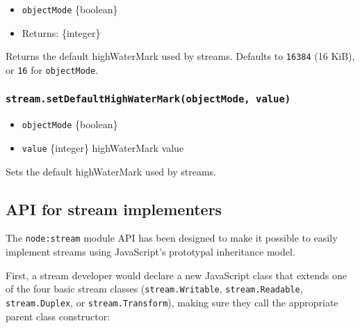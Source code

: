 \begin{itemize}
\tightlist
\item
  \texttt{objectMode} \{boolean\}
\item
  Returns: \{integer\}
\end{itemize}

Returns the default highWaterMark used by streams. Defaults to
\texttt{16384} (16 KiB), or \texttt{16} for \texttt{objectMode}.

\subsubsection{\texorpdfstring{\texttt{stream.setDefaultHighWaterMark(objectMode,\ value)}}{stream.setDefaultHighWaterMark(objectMode, value)}}\label{stream.setdefaulthighwatermarkobjectmode-value}

\begin{itemize}
\tightlist
\item
  \texttt{objectMode} \{boolean\}
\item
  \texttt{value} \{integer\} highWaterMark value
\end{itemize}

Sets the default highWaterMark used by streams.

\subsection{API for stream
implementers}\label{api-for-stream-implementers}

The \texttt{node:stream} module API has been designed to make it
possible to easily implement streams using JavaScript's prototypal
inheritance model.

First, a stream developer would declare a new JavaScript class that
extends one of the four basic stream classes (\texttt{stream.Writable},
\texttt{stream.Readable}, \texttt{stream.Duplex}, or
\texttt{stream.Transform}), making sure they call the appropriate parent
class constructor:

\begin{Shaded}
\begin{Highlighting}[]
\OperatorTok{=} \NormalTok{(}\NormalTok{)}\OperatorTok{;}

  \OperatorTok{,} 
    \OperatorTok{;}
\NormalTok{  \}}
\NormalTok{\}}
\end{Highlighting}
\end{Shaded}

